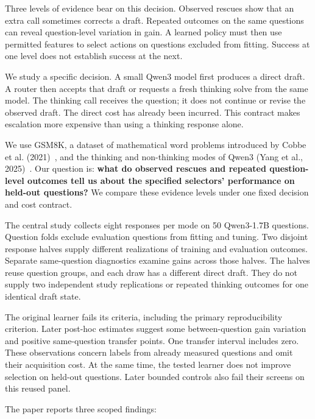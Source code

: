 \documentclass[11pt,a4paper]{article}
\begin{document}
Three levels of evidence bear on this decision. Observed rescues show that an extra call sometimes corrects a draft. Repeated outcomes on the same questions can reveal question-level variation in gain. A learned policy must then use permitted features to select actions on questions excluded from fitting. Success at one level does not establish success at the next.

We study a specific decision. A small Qwen3 model first produces a direct draft. A router then accepts that draft or requests a fresh thinking solve from the same model. The thinking call receives the question; it does not continue or revise the observed draft. The direct cost has already been incurred. This contract makes escalation more expensive than using a thinking response alone.

We use GSM8K, a dataset of mathematical word problems introduced by Cobbe et al. (2021)~\citep{cobbe2021gsm8k}, and the thinking and non-thinking modes of Qwen3 (Yang et al., 2025)~\citep{qwen2025qwen3}. Our question is: \textbf{what do observed rescues and repeated question-level outcomes tell us about the specified selectors' performance on held-out questions?} We compare these evidence levels under one fixed decision and cost contract.

The central study collects eight responses per mode on 50 Qwen3-1.7B questions. Question folds exclude evaluation questions from fitting and tuning. Two disjoint response halves supply different realizations of training and evaluation outcomes. Separate same-question diagnostics examine gains across those halves. The halves reuse question groups, and each draw has a different direct draft. They do not supply two independent study replications or repeated thinking outcomes for one identical draft state.

The original learner fails its criteria, including the primary reproducibility criterion. Later post-hoc estimates suggest some between-question gain variation and positive same-question transfer points. One transfer interval includes zero. These observations concern labels from already measured questions and omit their acquisition cost. At the same time, the tested learner does not improve selection on held-out questions. Later bounded controls also fail their screens on this reused panel.

The paper reports three scoped findings:
\end{document}
